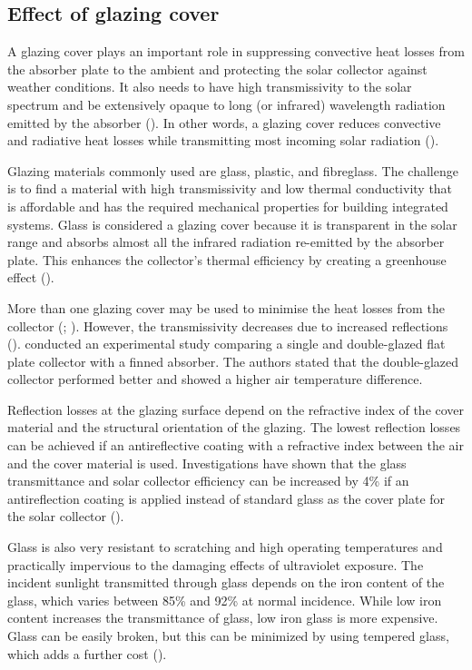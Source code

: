 \subsection{Effect of glazing cover} 

A glazing cover plays an important role in suppressing convective heat losses from the absorber plate to the ambient and protecting the solar collector against weather conditions. It also needs to have high transmissivity to the solar spectrum and be extensively opaque to long (or infrared) wavelength radiation emitted by the absorber (\cite{Saxena2015a}). In other words, a glazing cover reduces convective and radiative heat losses while transmitting most incoming solar radiation (\cite{Norton2006}).

Glazing materials commonly used are glass, plastic, and fibreglass. The challenge is to find a material with high transmissivity and low thermal conductivity that is affordable and has the required mechanical properties for building integrated systems. Glass is considered a glazing cover because it is transparent in the solar range and absorbs almost all the infrared radiation re-emitted by the absorber plate. This enhances the collector's thermal efficiency by creating a greenhouse effect (\cite{Khoukhi2006}).

More than one glazing cover may be used to minimise the heat losses from the collector (\cite{El-Sebaii2010}; \cite{Yeh2009}). However, the transmissivity decreases due to increased reflections (\cite{Michalopoulos1994}). \citet{Alta2010} conducted an experimental study comparing a single and double-glazed flat plate collector with a finned absorber. The authors stated that the double-glazed collector performed better and showed a higher air temperature difference.

Reflection losses at the glazing surface depend on the refractive index of the cover material and the structural orientation of the glazing. The lowest reflection losses can be achieved if an antireflective coating with a refractive index between the air and the cover material is used. Investigations have shown that the glass transmittance and solar collector efficiency can be increased by 4\% if an antireflection coating is applied instead of standard glass as the cover plate for the solar collector (\cite{Furbo2003}).  

Glass is also very resistant to scratching and high operating temperatures and practically impervious to the damaging effects of ultraviolet exposure. The incident sunlight transmitted through glass depends on the iron content of the glass, which varies between 85\% and 92\% at normal incidence. While low iron content increases the transmittance of glass, low iron glass is more expensive. Glass can be easily broken, but this can be minimized by using tempered glass, which adds a further cost (\cite{Duffie2013}).

